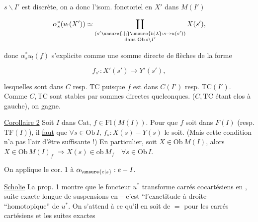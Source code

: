 
 $s\backslash I'$ est discrète, on a donc l'isom. fonctoriel en $X'$ dans $M(I')$

\[ \alpha_s^*(u_!(X'))\simeq\coprod_{\substack{(s'\unsure{,|;}\unsure{h|\lambda}:s\to u(s'))\\\text{dans }\mathrm{Ob}\,s\backslash I'}}X(s'), \]

 donc  $\alpha_s^*u_!(f)$ s'explicite comme une somme directe  de flèches de la forme

\[ f_{s'}:X'(s')\longrightarrow Y'(s'), \]

lesquelles sont dans $C$ resp. $\mathrm{TC}$ puisque $f$ est dans $C(I')$ resp. $\mathrm{TC}(I')$. Comme $C,\mathrm{TC}$ sont stables par sommes directes quelconques. ($C,\mathrm{TC}$ étant clos à gauche), on gagne.

\uline{Corollaire 2} Soit $I$ dans $\mathrm{Cat}$,  $f\in\mathrm{Fl}(M(I))$. Pour que $f$ soit dans $F(I)$ (resp.  $\mathrm{TF}(I)$), il \uline{faut} que $\forall s\in\mathrm{Ob}\,I$, $f_s:X(s)-Y(s)$ le soit. (Mais cette condition n'a pas   l'air d'être suffisante !) En particulier, soit $X\in\mathrm{Ob}\,M(I)$, alors $X\in\mathrm{Ob}\,M(I)_f$ $\Longrightarrow X(s)\in\mathrm{ob}\,M_f\quad\forall s\in\mathrm{Ob}\,I$.

On applique le cor. 1 à $\alpha_{\unsure{e|s}}:e-I$.

\uline{Scholie} La prop. 1  montre que le foncteur $u^*$ transforme carrés cocartésiens en , suite exacte longue de suspensions en  -- c'est ``l'exactitude à droite ``homotopique'' de $u^*$. On s'attend à ce qu'il en soit de $=$ pour les carrés cartésiens et les suites exactes

